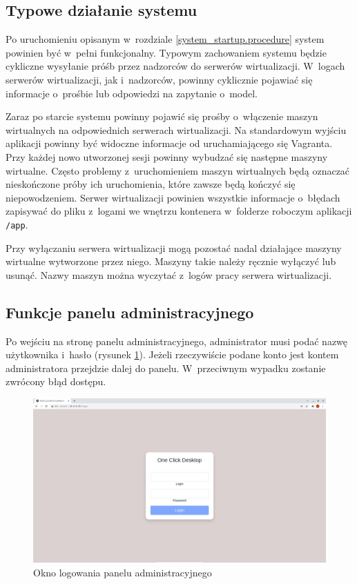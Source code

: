 \documentclass[../opis-rozwiazania.tex]{subfiles}
\begin{document}
\label{system_interaction}

\subsection{Typowe działanie systemu}
Po uruchomieniu opisanym w~rozdziale \ref{system_startup.procedure} system powinien być w~pełni funkcjonalny.
Typowym zachowaniem systemu będzie cykliczne wysyłanie próśb przez nadzorców do serwerów wirtualizacji.
W~logach serwerów wirtualizacji, jak i~nadzorców, powinny cyklicznie pojawiać się informacje o~prośbie lub odpowiedzi na zapytanie o~model.

Zaraz po starcie systemu powinny pojawić się prośby o~włączenie maszyn wirtualnych na odpowiednich serwerach wirtualizacji.
Na standardowym wyjściu aplikacji powinny być widoczne informacje od uruchamiającego się Vagranta.
Przy każdej nowo utworzonej sesji powinny wybudzać się następne maszyny wirtualne.
Często problemy z~uruchomieniem maszyn wirtualnych będą oznaczać nieskończone próby ich uruchomienia, które zawsze będą kończyć się niepowodzeniem.
Serwer wirtualizacji powinien wszystkie informacje o~błędach zapisywać do pliku z~logami we wnętrzu kontenera w~folderze roboczym aplikacji \texttt{/app}.

Przy wyłączaniu serwera wirtualizacji mogą pozostać nadal działające maszyny wirtualne wytworzone przez niego.
Maszyny takie należy ręcznie wyłączyć lub usunąć.
Nazwy maszyn można wyczytać z~logów pracy serwera wirtualizacji.

\subsection{Funkcje panelu administracyjnego}

Po wejściu na stronę panelu administracyjnego, administrator musi podać nazwę użytkownika i~hasło (rysunek \ref{figure:system_interaction.admin.login}).
Jeżeli rzeczywiście podane konto jest kontem administratora przejdzie dalej do panelu.
W~przeciwnym wypadku zostanie zwrócony błąd dostępu.

\begin{figure}[ht!]
  \centering
  \includegraphics[width=\textwidth]{resources/admin_panel_login.png}
  \caption{Okno logowania panelu administracyjnego}
  \label{figure:system_interaction.admin.login}
\end{figure}
\end{document}
